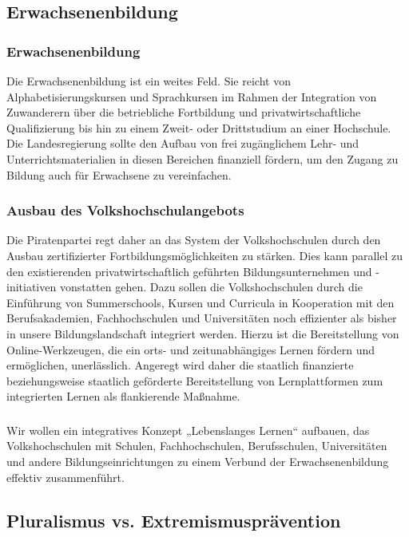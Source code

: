 \subsection*{Erwachsenenbildung}

\subsubsection{Erwachsenenbildung}
\abstimmung
Die Erwachsenenbildung ist ein weites Feld. Sie reicht von Alphabetisierungskursen und Sprachkursen im Rahmen der Integration von Zuwanderern über die betriebliche Fortbildung und privatwirtschaftliche Qualifizierung bis hin zu einem Zweit- oder Drittstudium an einer Hochschule. Die Landesregierung sollte den Aufbau von frei zugänglichem Lehr- und Unterrichtsmaterialien in diesen Bereichen finanziell fördern, um den Zugang zu Bildung auch für Erwachsene zu vereinfachen.

\subsubsection{Ausbau des Volkshochschulangebots}
\abstimmung
Die Piratenpartei regt daher an das System der Volkshochschulen durch den Ausbau zertifizierter Fortbildungsmöglichkeiten zu stärken. Dies kann parallel zu den existierenden privatwirtschaftlich geführten Bildungsunternehmen und -initiativen vonstatten gehen. Dazu sollen die Volkshochschulen durch die Einführung von Summerschools, Kursen und Curricula in Kooperation mit den Berufsakademien, Fachhochschulen und Universitäten noch effizienter als bisher in unsere Bildungslandschaft integriert werden. Hierzu ist die Bereitstellung von Online-Werkzeugen, die ein orts- und zeitunabhängiges Lernen fördern und ermöglichen, unerlässlich. Angeregt wird daher die staatlich finanzierte beziehungsweise staatlich geförderte Bereitstellung von Lernplattformen zum integrierten Lernen als flankierende Maßnahme.

\subsubsection{ }
\abstimmung
Wir wollen ein integratives Konzept „Lebenslanges Lernen“ aufbauen, das Volkshochschulen mit Schulen, Fachhochschulen, Berufsschulen, Universitäten und andere Bildungseinrichtungen zu einem Verbund der Erwachsenenbildung effektiv zusammenführt.

\newpage
\subsection*{Pluralismus vs. Extremismusprävention}
\label{wp:bildung:projekte}

